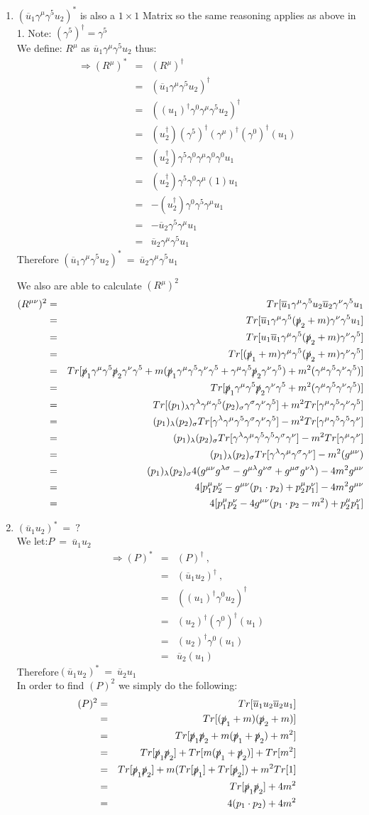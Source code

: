 \documentclass[12pt]{article}
\def \bea{\begin{eqnarray}}
\def \eea{\end{eqnarray}}
\def \nn{\nonumber}
\def \nl{\nn \\}
\def \ou{\overline{u}}
\def \ga{\gamma}
\def \la{\lambda}
\def \si{\sigma}
\begin{document}
\begin{enumerate}
\item $(\ou_1\ga^\mu \ga^5 u_2)^*$ is also a $1\times1$ Matrix so the same reasoning applies as above in 1. Note: $(\ga^5)^\dag = \ga^5$\nl
We define: $R^\mu$ as $\ou_1\ga^\mu\ga^5 u_2$ thus:
\bea
\Rightarrow (R^\mu)^* &=& (R^\mu)^\dag \\ 
&=&(\ou_1\ga^\mu\ga^5 u_2)^\dag  \nl 
&=& ((u_1)^\dag\ga^0\ga^\mu\ga^5 u_2)^\dag \nl 
&=& (u_2^\dag)(\ga^5)^\dag(\ga^\mu)^\dag(\ga^0)^\dag(u_1) \nl 
&=& (u_2^\dag)\ga^5\ga^0\ga^\mu\ga^0\ga^0 u_1 \nl 
&=& (u_2^\dag)\ga^5\ga^0\ga^\mu(1) u_1 \nl 
&=& -(u_2^\dag)\ga^0\ga^5\ga^\mu u_1 \nl 
&=& -\ou_2\ga^5\ga^\mu u_1 \nl 
&=& \ou_2\ga^\mu\ga^5 u_1 
\eea 
%
Therefore $(\ou_1\ga^\mu \ga^5 u_2)^*~=~\ou_2 \ga^\mu \ga^5 u_1$

We also are able to calculate $(R^\mu)^2$ 
\bea
(R^{\mu\nu})^2 &=& Tr[\ou_1\ga^\mu \ga^5 u_2\ou_2 \ga^\nu \ga^5 u_1 \\ 
&=& Tr[\ou_1\ga^\mu \ga^5 (\slashed{p}_2+m) \ga^\nu \ga^5 u_1]  \nl 
&=&Tr[u_1\ou_1\ga^\mu \ga^5 (\slashed{p}_2+m) \ga^\nu \ga^5 ]\nl 
&=&Tr[(\slashed{p}_1+m)\ga^\mu \ga^5 (\slashed{p}_2+m) \ga^\nu \ga^5 ]\nl 
&=& Tr[\slashed{p}_1\ga^\mu\ga^5 \slashed{p}_2\ga^\nu \ga^5 + m( \slashed{p}_1\ga^\mu\ga^5\ga^\nu \ga^5 +\ga^\mu\ga^5 \slashed{p}_2\ga^\nu \ga^5) + m^2(\ga^\mu\ga^5\ga^\nu \ga^5)] \nl  
&=&Tr[\slashed{p}_1\ga^\mu\ga^5 \slashed{p}_2\ga^\nu \ga^5 + m^2(\ga^\mu\ga^5\ga^\nu \ga^5)] \nl 
&=& Tr[(p_1)_\la\ga^\la\ga^\mu\ga^5 (p_2)_\si\ga^\si\ga^\nu \ga^5] + m^2Tr[\ga^\mu\ga^5\ga^\nu \ga^5]\nl 
&=& (p_1)_\la(p_2)_\si Tr[\ga^\la\ga^\mu\ga^5 \ga^\si\ga^\nu \ga^5] - m^2Tr[\ga^\mu\ga^5\ga^5 \ga^\nu]\nl 
&=& (p_1)_\la(p_2)_\si Tr[\ga^\la\ga^\mu\ga^5\ga^5 \ga^\si\ga^\nu] - m^2Tr[\ga^\mu\ga^\nu]\nl 
&=& (p_1)_\la(p_2)_\si Tr[\ga^\la\ga^\mu\ga^\si\ga^\nu] - m^2(g^{\mu\nu})\nl 
&=& (p_1)_\la(p_2)_\si 4(g^{\mu\nu}g^{\la\si} - g^{\mu\la} g^{\nu\si} + g^{\mu\si}g^{\nu\la}) - 4m^2g^{\mu\nu}\nl 
&=& 4[p_1^\mu p_2^\nu - g^{\mu\nu}(p_1 \cdot p_2) + p_2^\mu p_1^\nu] - 4m^2g^{\mu\nu} \nl
&=& 4[p_1^\mu p_2^\nu - 4g^{\mu\nu}(p_1 \cdot p_2 - m^2) + p_2^\mu p_1^\nu]
\eea 

\item $ (\ou_1 u_2)^* ~=~ ?$ \nl
We let:$P ~=~ \ou_1 u_2$
\bea
\Rightarrow (P)^* &=& (P)^\dag ~,~~ \\ 
&=& (\ou_1 u_2)^\dag ~,~~ \nl 
&=& ((u_1)^\dag\ga^0 u_2)^\dag \nl 
&=& (u_2)^\dag(\ga^0)^\dag(u_1)\nl 
&=& (u_2)^\dag\ga^0(u_1)\nl
&=& \ou_2(u_1)
\eea
Therefore$(\ou_1 u_2)^* ~=~ \ou_2 u_1$\nl 
In order to find $(P)^2$ we simply do the following: 
\bea
(P)^2&=& Tr[\ou_1 u_2 \ou_2 u_1]  \\ 
&=& Tr[(\slashed{p}_1+m)(\slashed{p}_2+m)] \nl 
&=& Tr[\slashed{p}_1\slashed{p}_2+m(\slashed{p}_1+\slashed{p}_2)+m^2]\nl 
&=& Tr[\slashed{p}_1\slashed{p}_2]+Tr[m(\slashed{p}_1+\slashed{p}_2)]+Tr[m^2] \nl 
&=& Tr[\slashed{p}_1\slashed{p}_2]+m(Tr[\slashed{p}_1]+Tr[\slashed{p}_2])+m^2Tr[1] \nl 
&=& Tr[\slashed{p}_1\slashed{p}_2]+4m^2 \nl
&=& 4(p_1 \cdot p_2)+4m^2
\eea


\end{enumerate}
\end{document}
